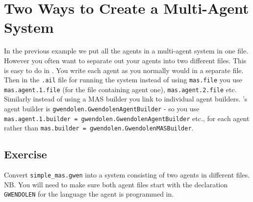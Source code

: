 \documentclass[a4]{article}
\begin{document}
\section{Two Ways to Create a Multi-Agent System}

In the previous example we put all the agents in a multi-agent system in one file.  However you often want to separate out your agents into two different files.  This is easy to do in \gwendolen.  You write each agent as you normally would in a separate file.  Then in the \texttt{.ail} file for running the system instead of using \texttt{mas.file} you use \texttt{mas.agent.1.file} (for the file containing agent one), \texttt{mas.agent.2.file} etc.  Similarly instead of using a MAS builder you link to individual agent builders.  \gwendolen's agent builder is \texttt{gwendolen.GwendolenAgentBuilder} - so you use \texttt{mas.agent.1.builder = gwendolen.GwendolenAgentBuilder} etc., for each agent rather than \texttt{mas.builder = gwendolen.GwendolenMASBuilder}.

\subsection{Exercise}
Convert \texttt{simple\_mas.gwen} into a system consisting of two agents in different files.  NB.  You will need to make sure both agent files start with the declaration \texttt{GWENDOLEN} for the language the agent is programmed in.
\end{document}
